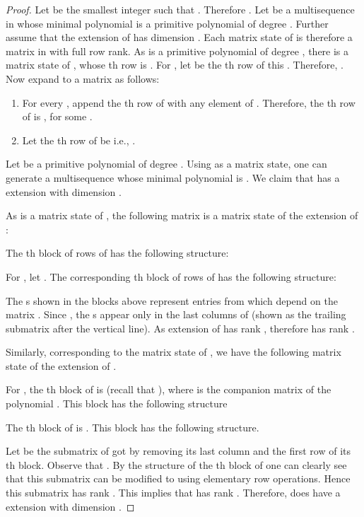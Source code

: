 \documentclass[letterpaper, 12 pt]{article}  \usepackage{amssymb}
\begin{document}
\begin{proof}
Let  be the smallest integer such that . Therefore . Let  be a multisequence in  whose minimal 
polynomial  is a primitive polynomial of degree . Further 
assume that the extension of  has dimension .
 Each matrix state of  is therefore a matrix in  with
full row rank. As  is a primitive polynomial 
of degree , there is a matrix state  of , whose th row is 
. For , let
 be
the th
row of this . Therefore, . Now expand  to a matrix  as follows:
\begin{enumerate}
 \item For every , append the th row of  with any element 
of . Therefore, the th row of  is , for some .
\item Let the th row of  be  i.e., .
 
\end{enumerate}
Let  be a primitive polynomial of degree . Using  
as a matrix state, one can generate a multisequence  whose minimal 
polynomial is . We claim that  has a extension with dimension 
.  

As  is a matrix state of , the following matrix  is a
 matrix state of the  extension of :

 The th block of rows of
 has the following structure:
 

For , let .
The corresponding th block of rows of  has the following
structure:

The s shown in the blocks above represent entries from  which depend on
the matrix . Since  , the s appear only in
the last  columns of  (shown as the trailing submatrix after the vertical line). As extension of  has
rank , therefore  has rank . 

Similarly, corresponding to the matrix state  of , we have the
following matrix state of the extension of .



 For , the th block of  is
 (recall that ), where  is the companion matrix of the polynomial
. This block has the following structure


 The th block of  is
.
This block has the following structure.
 
 

Let  be the submatrix of  got by removing its last column and the
first row of its th block. Observe that . By the
structure of the th block of
 one can clearly see that this submatrix  can be modified to 
using elementary row operations. Hence this submatrix  has rank . This
implies that  has rank . Therefore,  does have a extension with dimension .


\end{proof}
\end{document}

